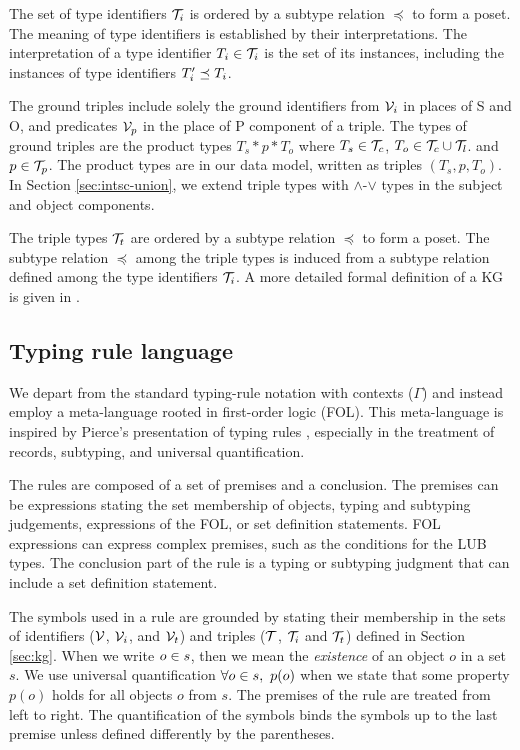 \documentclass[runningheads]{llncs}
\newcommand{\V}{{\cal V}}
\newcommand{\TT}{{\cal T}}
\begin{document}
The set of type identifiers $\TT_i$ is ordered by a subtype relation
$\preceq$ to form a poset. The meaning of type identifiers is
established by their interpretations. The interpretation of a type
identifier $T_i\in\TT_i$ is the set of its instances, including the
instances of type identifiers $T_i'\preceq\/T_i$.

The ground triples include solely the ground identifiers from $\V_i$
in places of S and O, and predicates $\V_p$ in the place of P
component of a triple. The types of ground triples are the product
types $T_s*p*T_o$ where $T_s\in\TT_c$, $T_o\in\TT_c\cup\TT_l$. and
$p\in\TT_p$. The product types are in our data model, written as
triples $(T_s,p,T_o)$. In Section \ref{sec:intsc-union}, we extend
triple types with $\land$-$\lor$ types in the subject and object
components.

The triple types $\TT_t$ are ordered by a subtype relation $\preceq$ to
form a poset. The subtype relation $\preceq$ among the triple types is
induced from a subtype relation defined among the type identifiers
$\TT_i$. A more detailed formal definition of a KG is given in
\cite{Savnik2025}.




\subsection{Typing rule language}

We depart from the standard typing-rule notation with contexts
($\Gamma$) \cite{Pierce2002,Hindley1997} and instead employ a
meta-language rooted in first-order logic (FOL). This meta-language is
inspired by Pierce’s presentation of typing rules \cite{Pierce2002},
especially in the treatment of records, subtyping, and universal
quantification.

The rules are composed of a set of premises and a conclusion. The
premises can be expressions stating the set membership of objects,
typing and subtyping judgements, expressions of the FOL, or set
definition statements. FOL expressions can express complex premises,
such as the conditions for the LUB types. The conclusion part of the
rule is a typing or subtyping judgment that can include a set
definition statement.

The symbols used in a rule are grounded by stating their membership in
the sets of identifiers ($\V$, $\V_i$, and $\V_t$) and triples ($\TT$,
$\TT_i$ and $\TT_t$) defined in Section \ref{sec:kg}. When we write
$o\in\/s$, then we mean the \emph{existence} of an object $o$ in a set
$s$. We use universal quantification $\forall\/o\in\/s,\ p(o)$ when we
state that some property $p(o)$ holds for all objects $o$ from
$s$. The premises of the rule are treated from left to right. The
quantification of the symbols binds the symbols up to the last premise
unless defined differently by the parentheses.
\end{document}
